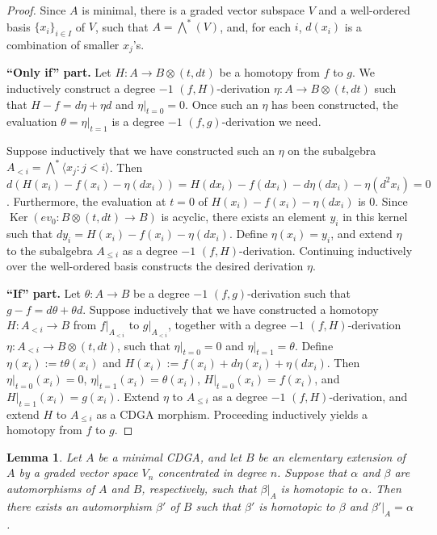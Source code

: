 \documentclass[11pt]{amsart}
\newtheorem{lemma}[theorem]{Lemma}
\theoremstyle{definition}
\numberwithin{equation}{section}
\numberwithin{equation}{section}
\DeclareMathOperator{\Ker}{Ker}
\begin{document}
\begin{proof}
Since $A$ is minimal, there is a graded vector subspace $V$ and a well-ordered basis $\{x_i\}_{i\in I}$ of $V$, such that $A=\bigwedge^*(V)$, and, for each $i$,  $d(x_i)$ is a combination of smaller $x_j$'s.

\textbf{``Only if'' part.} Let $H:A\rightarrow B\otimes (t,dt)$ be a homotopy from $f$ to $g$. We inductively construct a degree $-1$ $(f,H)$-derivation $\eta:A\rightarrow B\otimes (t,dt)$ such that $H-f=d\eta+\eta d$ and $\eta\vert_{t=0}=0$. Once such an $\eta$ has been constructed, the evaluation $\theta=\eta\vert_{t=1}$ is a degree $-1$ $(f,g)$-derivation we need.

Suppose inductively that we have constructed such an $\eta$ on the subalgebra $A_{<i}=\bigwedge^* \langle x_{j}:j< i\rangle$. Then $d(H(x_i)-f(x_i)-\eta(dx_i))=H(dx_i)-f(dx_i)-d\eta(dx_i)-\eta(d^2x_i)=0$. Furthermore, the evaluation at $t=0$ of $H(x_i)-f(x_i)-\eta(dx_i)$ is $0$. Since $\Ker(ev_0:B\otimes (t,dt)\rightarrow B)$ is acyclic, there exists an element $y_i$ in this kernel such that $dy_i=H(x_i)-f(x_i)-\eta(dx_i)$. Define $\eta(x_i)=y_i$, and extend $\eta$ to the subalgebra $A_{\leq i}$ as a degree $-1$ $(f,H)$-derivation. Continuing inductively over the well-ordered basis constructs the desired derivation $\eta$.

\textbf{``If'' part.} Let $\theta:A\rightarrow B$ be a degree $-1$ $(f,g)$-derivation such that $g-f=d\theta+\theta d$. Suppose inductively that we have constructed a homotopy $H:A_{<i}\rightarrow B$ from $f\vert_{A_{<i}}$ to $g\vert_{A_{<i}}$, together with a degree $-1$ $(f,H)$-derivation $\eta:A_{<i}\rightarrow B\otimes (t,dt)$, such that $\eta\vert_{t=0}=0$ and $\eta\vert_{t=1}=\theta$. Define $\eta(x_i):=t\theta(x_i)$ and $H(x_i):=f(x_i)+d\eta(x_i)+\eta(dx_i)$. Then $\eta\vert_{t=0}(x_i)=0$, $\eta\vert_{t=1}(x_i)=\theta(x_i)$, $H\vert_{t=0}(x_i)=f(x_i)$, and $H\vert_{t=1}(x_i)=g(x_i)$. Extend $\eta$ to $A_{\leq i}$ as a degree $-1$ $(f,H)$-derivation, and extend $H$ to $A_{\leq i}$ as a CDGA morphism. Proceeding inductively yields a homotopy from $f$ to $g$.
\end{proof}

\begin{lemma}\label{Lem: rectification of homotopic automorphisms for elementary extensions}
Let $A$ be a minimal CDGA, and let $B$ be an elementary extension of $A$ by a graded vector space $V_n$ concentrated in degree $n$. Suppose that $\alpha$ and $\beta$ are automorphisms of $A$ and $B$, respectively, such that $\beta\vert_{A}$ is homotopic to $\alpha$. Then there exists an automorphism $\beta'$ of $B$ such that $\beta'$ is homotopic to $\beta$ and $\beta'\vert_{A}=\alpha$. 
\end{lemma}
\end{document}
